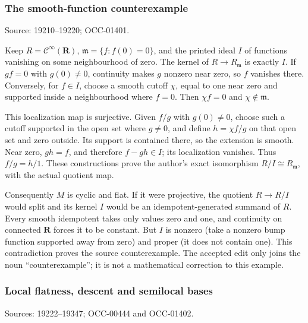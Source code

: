 \subsubsection{The smooth-function counterexample}\label{the-smooth-function-counterexample}

Source: 19210--19220; OCC-01401.

Keep \(R=\mathcal C^\infty(\mathbf R)\), \(\mathfrak m=\{f:f(0)=0\}\), and the printed ideal \(I\) of functions vanishing on some neighbourhood of zero. The kernel of \(R\to R_{\mathfrak m}\) is exactly \(I\). If \(gf=0\) with \(g(0)\ne0\), continuity makes \(g\) nonzero near zero, so \(f\) vanishes there. Conversely, for \(f\in I\), choose a smooth cutoff \(\chi\), equal to one near zero and supported inside a neighbourhood where \(f=0\). Then \(\chi f=0\) and \(\chi\notin\mathfrak m\).

This localization map is surjective. Given \(f/g\) with \(g(0)\ne0\), choose such a cutoff supported in the open set where \(g\ne0\), and define \(h=\chi f/g\) on that open set and zero outside. Its support is contained there, so the extension is smooth. Near zero, \(gh=f\), and therefore \(f-gh\in I\); its localization vanishes. Thus \(f/g=h/1\). These constructions prove the author's exact isomorphism \(R/I\cong R_{\mathfrak m}\), with the actual quotient map.

Consequently \(M\) is cyclic and flat. If it were projective, the quotient \(R\to R/I\) would split and its kernel \(I\) would be an idempotent-generated summand of \(R\). Every smooth idempotent takes only values zero and one, and continuity on connected \(\mathbf R\) forces it to be constant. But \(I\) is nonzero (take a nonzero bump function supported away from zero) and proper (it does not contain one). This contradiction proves the source counterexample. The accepted edit only joins the noun ``counterexample''; it is not a mathematical correction to this example.

\subsubsection{Local flatness, descent and semilocal bases}\label{local-flatness-descent-and-semilocal-bases}

Sources: 19222--19347; OCC-00444 and OCC-01402.

